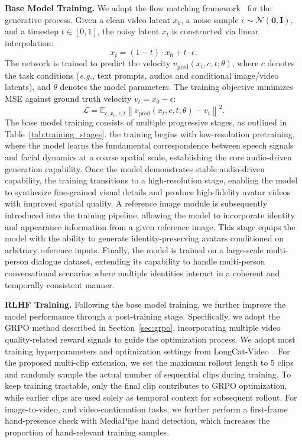 \noindent\textbf{Base Model Training.}
We adopt the flow matching framework~\cite{lipman2022flow} for the 
generative process. Given a clean video latent $x_0$, a noise 
sample $\epsilon \sim \mathcal{N}(\mathbf{0}, \mathbf{I})$, 
and a timestep $t \in [0, 1]$, the noisy latent $x_t$ is 
constructed via linear interpolation:
\begin{equation}
    x_t = (1 - t) \cdot x_0 + t \cdot \epsilon.
    \label{eq:xt}
\end{equation}
The network is trained to predict the velocity 
$v_{\text{pred}}(x_t, c, t; \theta)$, 
where $c$ denotes the task conditions (\emph{e.g.}, text prompts, audios  
and conditional image/video latents), and $\theta$ denotes
the model parameters. The training objective minimizes MSE against
 ground truth velocity $v_t = x_0 - \epsilon$:
\begin{equation}
    \mathcal{L} = \mathbb{E}_{\epsilon, x_0, c, t}
    \left\| v_{\text{pred}}(x_t, c, t; 
    \theta) - v_t \right\|^2.
    \label{eq:loss}
\end{equation}
The base model training consists of multiple progressive stages,  as
outlined in Table~\ref{tab:training_stages}. the training begins with low-resolution pretraining, where the model 
learns the fundamental correspondence between speech signals and facial 
dynamics at a coarse spatial scale, establishing the core audio-driven 
generation capability.
Once the model demonstrates stable audio-driven capability, the training 
transitions to a high-resolution stage, enabling the model to synthesize 
fine-grained visual details and produce high-fidelity avatar videos with 
improved spatial quality.
A reference image module is subsequently introduced into the training 
pipeline, allowing the model to incorporate identity and appearance 
information from a given reference image. This stage equips the model 
with the ability to generate identity-preserving avatars conditioned on 
arbitrary reference inputs.
Finally, the model is trained on a large-scale multi-person dialogue 
dataset, extending its capability to handle multi-person conversational 
scenarios where multiple identities interact in a coherent and temporally 
consistent manner.





\noindent\textbf{RLHF Training.}
Following the base model training, we further improve the model 
performance through a post-training stage. Specifically, we adopt 
the GRPO method described in Section~\ref{sec:grpo}, incorporating 
multiple video quality-related reward signals to guide the optimization process.
We adopt most training hyperparameters and optimization settings from LongCat-Video~\cite{team2025longcat}. For the proposed multi-clip extension, we set the maximum rollout length to 5 clips and randomly sample the actual number of sequential clips during training. To keep training tractable, only the final clip contributes to GRPO optimization, while earlier clips are used solely as temporal context for subsequent rollout. For image-to-video, and video-continuation tasks, we further perform a first-frame hand-presence check with MediaPipe hand detection, which increases the proportion of hand-relevant training samples.




